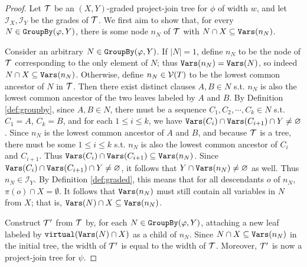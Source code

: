\begin{proof}
Let $\mathcal{T}$ be an $(X,Y)$-graded project-join tree for $\phi$ of width $w$, and let $\mathcal{I}_X, \mathcal{I}_Y$ be the grades of $\mathcal{T}$. 
We first aim to show that, for every $N \in \texttt{\upshape GroupBy}(\varphi, Y)$, there is some node $n_N$ of $\mathcal{T}$ with $N \cap X \subseteq \texttt{\upshape Vars}(n_N)$. 

Consider an arbitrary $N \in \texttt{\upshape GroupBy}(\varphi, Y)$. If $|N| = 1$, define $n_N$ to be the node of $\mathcal{T}$ corresponding to the only element of $N$; thus $\texttt{\upshape Vars}(n_N) = \texttt{\upshape Vars}(N)$, so indeed $N \cap X \subseteq \texttt{\upshape Vars}(n_N)$. 
Otherwise, define $n_N \in \mathcal{V}(T)$ to be the lowest common ancestor of $N$ in $\mathcal{T}$. 
Then there exist distinct clauses $A, B \in N$ s.t. $n_N$ is also the lowest common ancestor of the two leaves labeled by $A$ and $B$. 
By Definition \ref{def:groupby}, since $A, B \in N$, there must be a sequence $C_1, C_2, \cdots, C_k \in N$ s.t. $C_1 = A$, $C_k = B$, and for each $1 \leq i \leq k$, we have $\texttt{\upshape Vars}(C_i) \cap \texttt{\upshape Vars}(C_{i+1}) \cap Y \neq \varnothing$. 
Since $n_N$ is the lowest common ancestor of $A$ and $B$, and because $\mathcal{T}$ is a tree, there must be some $1 \leq i \leq k$ s.t. $n_N$ is also the lowest common ancestor of $C_i$ and $C_{i+1}$. Thus $\texttt{\upshape Vars}(C_i) \cap \texttt{\upshape Vars}(C_{i+1}) \subseteq \texttt{\upshape Vars}(n_N)$. 
Since $\texttt{\upshape Vars}(C_i) \cap \texttt{\upshape Vars}(C_{i+1}) \cap Y \neq \varnothing$, it follows that $Y \cap \texttt{\upshape Vars}(n_N) \neq \varnothing$ as well. Thus $n_N \in \mathcal{I}_Y$. By Definition \ref{def:graded}, this means that for all descendants $o$ of $n_N$, $\pi(o) \cap X = \emptyset$. It follows that $\texttt{\upshape Vars}(n_N)$ must still contain all variables in $N$ from $X$; that is, $\texttt{\upshape Vars}(N) \cap X \subseteq \texttt{\upshape Vars}(n_N)$.

Construct $\mathcal{T}'$ from $\mathcal{T}$ by, for each $N \in \texttt{\upshape GroupBy}(\varphi, Y)$, attaching a new leaf labeled by $\texttt{\upshape virtual}(\texttt{\upshape Vars}(N) \cap X)$ as a child of $n_N$. 
Since $N \cap X \subseteq \texttt{\upshape Vars}(n_N)$ in the initial tree, the width of $\mathcal{T}'$ is equal to the width of $\mathcal{T}$. Moreover, $\mathcal{T}'$ is now a project-join tree for $\psi$.
\end{proof}


